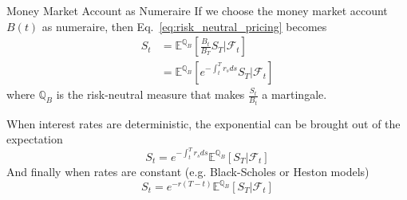 \documentclass{beamer}
\begin{document}
\begin{frame}{Money Market Account as Numeraire}
	If we choose the money market account $B(t)$ as numeraire, then Eq.~\ref{eq:risk_neutral_pricing} becomes
	\begin{equation*}
		\begin{aligned}
			S_t &= \mathbb{E}^{\mathbb{Q}_B}\left[\frac{B_t}{B_T}S_T|\mathcal{F}_t\right]\\
			&=\mathbb{E}^{\mathbb{Q}_B}\left[e^{-\int_t^T r_s ds}S_T|\mathcal{F}_t\right]
		\end{aligned}
	\end{equation*}
	where $\mathbb{Q}_B$ is the risk-neutral measure that makes $\frac{S_t}{B_t}$ a martingale. 
	
	When interest rates are deterministic, the exponential can be brought out of the expectation
	\begin{equation*}
		S_t = e^{-\int_t^T r_s ds} \mathbb{E}^{\mathbb{Q}_B}\left[S_T|\mathcal{F}_t\right]
	\end{equation*}
	And finally when rates are constant (e.g. Black-Scholes or Heston models)
	\begin{equation*}
		S_t = e^{-r(T-t)}\mathbb{E}^{\mathbb{Q}_B}\left[S_T|\mathcal{F}_t\right]
	\end{equation*}
\end{frame}
\end{document}
